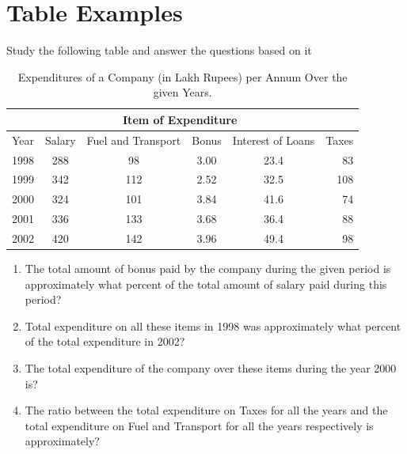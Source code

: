 \documentclass{article}
\begin{document}
\section{Table Examples}
Study the following table and answer the questions based on it 
\cite{float}

\begin{table}[h] 
\begin{tabular}{|l|c|c|c|c|r|}
\hline
 & \multicolumn{4}{c}{Item of Expenditure} \\ \hline
Year & Salary & Fuel and Transport & Bonus & Interest of Loans & Taxes\\
 \hline
 1998 & 288 & 98 & 3.00 & 23.4 & 83 \\ 
  \hline
 1999 & 342 & 112 & 2.52 & 32.5 & 108 \\ 
  \hline
 2000 & 324 & 101 & 3.84 & 41.6 & 74 \\ 
 \hline
 2001 & 336 & 133 & 3.68 & 36.4 & 88 \\ 
 \hline
 2002 & 420 & 142 & 3.96 & 49.4 & 98 \\ 
 \hline
\end{tabular}
\caption{\label{Question I} Expenditures of a Company (in Lakh Rupees) per Annum Over the given Years.}
\end{table}


\begin{enumerate}
\item The total amount of bonus paid by the company during the given period is approximately what percent of the total amount of salary paid during this period?
\item Total expenditure on all these items in 1998 was approximately what percent of the total expenditure in 2002?
\item The total expenditure of the company over these items during the year 2000 is?
\item The ratio between the total expenditure on Taxes for all the years and the total expenditure on Fuel and Transport for all the years respectively is approximately?
\end{enumerate}
\end{document}
